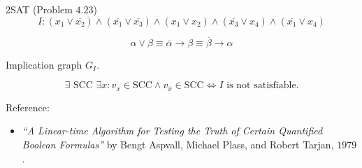 % 
\begin{frame}{}
  \begin{exampleblock}{2SAT (Problem $4.23$)}
    \[
      I: (x_1 \lor \overline{x_2}) \land (\overline{x_1} \lor \overline{x_3}) \land (x_1 \lor x_2) \land (\overline{x_3} \lor x_4) \land (\overline{x_1} \lor x_4)
    \]
  \end{exampleblock}

  \pause
  \[
    \alpha \lor \beta \equiv \overline{\alpha} \to \beta \equiv \overline{\beta} \to \alpha
  \]

  \pause
  \begin{center}
    Implication graph $G_I$.
  \end{center}

  \pause
  \begin{theorem}[2SAT]
    \[
      \exists \text{ SCC } \exists x: v_x \in \text{SCC} \land v_{\overline{x}} \in \text{SCC} \iff I \text{ is not satisfiable}.
    \]
  \end{theorem}

  \pause
  \begin{alertblock}{Reference:}
    \begin{itemize}
      \item {\it ``A Linear-time Algorithm for Testing the Truth of Certain Quantified Boolean Formulas''} 
	by Bengt Aspvall, Michael Plass, and Robert Tarjan, $1979$.
    \end{itemize}
  \end{alertblock}
\end{frame}
